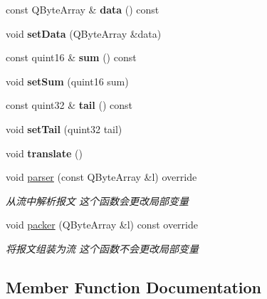 \begin{DoxyCompactItemize}
const Q\+Byte\+Array \& {\bfseries data} () const
\item 
\mbox{\label{class_q_q_t_network_message_a67ad35bcec9191dfd644bf9b5e2c7cff}} 
void {\bfseries set\+Data} (Q\+Byte\+Array \&data)
\item 
\mbox{\label{class_q_q_t_network_message_a24dd34d36f3e64839008b71a62dc824e}} 
const quint16 \& {\bfseries sum} () const
\item 
\mbox{\label{class_q_q_t_network_message_ae425f962de3fb202f0a801c7b9437cec}} 
void {\bfseries set\+Sum} (quint16 sum)
\item 
\mbox{\label{class_q_q_t_network_message_a87d2864f5cf89cf007fb9223fa229fc4}} 
const quint32 \& {\bfseries tail} () const
\item 
\mbox{\label{class_q_q_t_network_message_a4b4fe7f8b63a8120c4f39058c3dfabb6}} 
void {\bfseries set\+Tail} (quint32 tail)
\item 
\mbox{\label{class_q_q_t_network_message_aa432338e251243b4af3563e4f435f095}} 
void {\bfseries translate} ()
\item 
void \mbox{\hyperlink{class_q_q_t_network_message_a56a22ccc712447fb573536a9d51b36d6}{parser}} (const Q\+Byte\+Array \&l) override
\begin{DoxyCompactList}\small\item\em 从流中解析报文 这个函数会更改局部变量 \end{DoxyCompactList}\item 
void \mbox{\hyperlink{class_q_q_t_network_message_a9d1d30ef9d14a5a4586e234a00ab19d4}{packer}} (Q\+Byte\+Array \&l) const override
\begin{DoxyCompactList}\small\item\em 将报文组装为流 这个函数不会更改局部变量 \end{DoxyCompactList}\end{DoxyCompactItemize}


\subsection{Member Function Documentation}
\mbox{\label{class_q_q_t_network_message_a9d1d30ef9d14a5a4586e234a00ab19d4}} 
